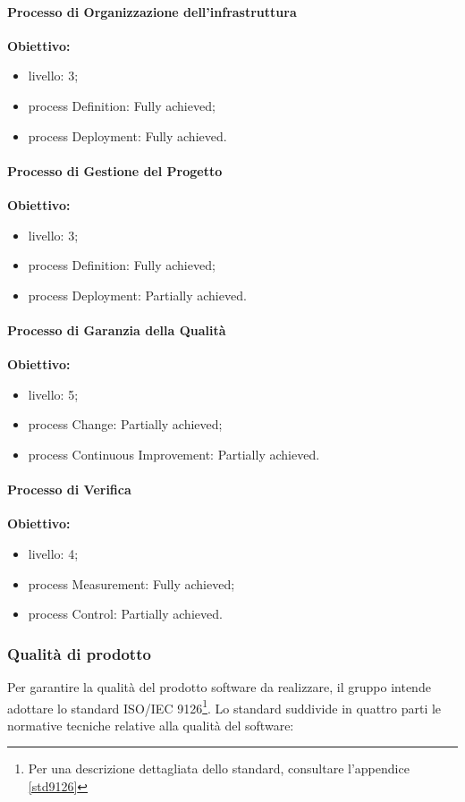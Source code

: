 \paragraph{Processo di Organizzazione dell'infrastruttura\\}
\textbf{Obiettivo:}
	\begin{itemize}
	\item livello: 3;
	\item process Definition: Fully achieved;
	\item process Deployment: Fully achieved.
\end{itemize}
 
\paragraph{Processo di Gestione del Progetto\\}
\textbf{Obiettivo:}
	\begin{itemize}
	\item livello:  3;
	\item process Definition: Fully achieved;
	\item process Deployment: Partially achieved.
\end{itemize}	

\paragraph{Processo di Garanzia della Qualità\\}
\textbf{Obiettivo:}
	\begin{itemize}
	\item livello: 5;
	\item process Change: Partially achieved;
	\item process Continuous Improvement: Partially achieved.
\end{itemize}
\paragraph{Processo di Verifica\\}
\textbf{Obiettivo:}
	\begin{itemize}
	\item livello: 4;
	\item process Measurement: Fully achieved;
	\item process Control: Partially achieved.
\end{itemize}
	
\subsubsection{Qualità di prodotto}
Per garantire la qualità del prodotto software da realizzare, il gruppo intende adottare lo standard ISO\glossario{}/IEC\glossario{} 9126\footnote{Per una descrizione dettagliata dello standard, consultare l'appendice \ref{std9126}}. Lo standard suddivide in quattro parti le normative tecniche relative alla qualità del software:

